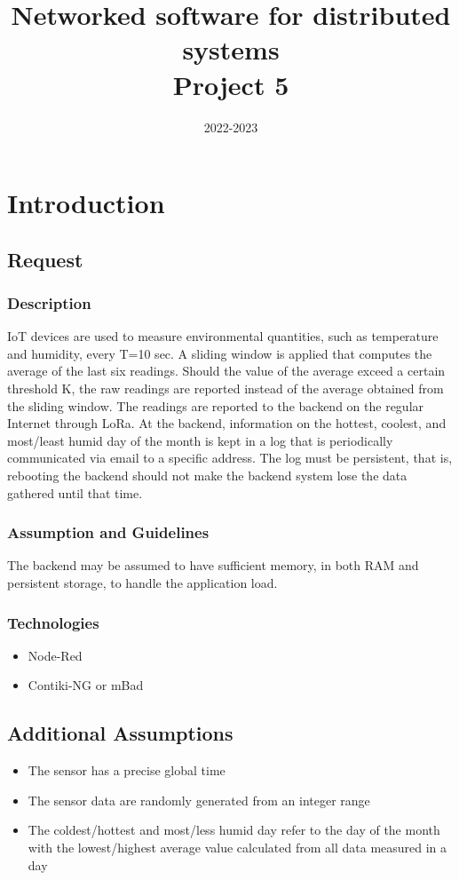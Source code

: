 \documentclass[11pt]{article}
\title{Networked software for distributed systems\\Project 5}
\date{2022-2023}
\begin{document}


\tableofcontents
\cleardoublepage

\section{Introduction}
\subsection{Request}
\subsubsection{Description}
IoT devices are used to measure environmental quantities, such as temperature and humidity, every T=10 sec.  A sliding window is applied that computes the average of the last six readings.  Should the value of the average exceed a certain threshold K, the raw readings are reported instead of the average obtained from the sliding window. The readings are reported to the backend on the regular Internet through LoRa. At the backend, information on the hottest, coolest, and most/least humid day of the month is kept in a log that is periodically communicated via email to a specific address. The log must be persistent, that is, rebooting the backend should not make the backend system lose the data gathered until that time.
\subsubsection{Assumption and Guidelines}
The backend may be assumed to have sufficient memory, in both RAM and persistent storage, to handle the application load.
\subsubsection{Technologies}
\begin{itemize}
    \item Node-Red
    \item Contiki-NG or mBad
\end{itemize}

\subsection{Additional Assumptions}
\begin{itemize}
    \item The sensor has a precise global time 
    \item The sensor data are randomly generated from an integer range
    \item The coldest/hottest and most/less humid day refer to the day of the month with the lowest/highest average value calculated from all data measured in a day
\end{itemize}
\cleardoublepage
\end{document}
